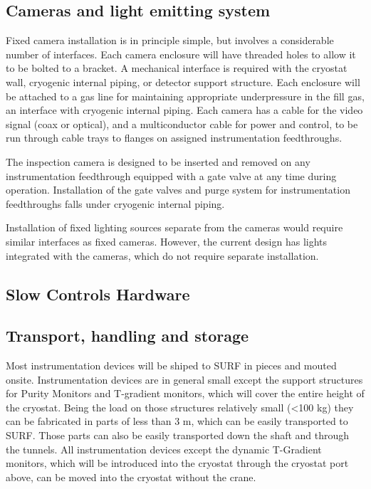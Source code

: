 \subsection{Cameras and light emitting system}
\label{sec:fdgen-slow-cryo-install-c}

Fixed camera installation is in principle simple, but involves a
considerable number of interfaces. Each camera enclosure will have
threaded holes to allow it to be bolted to a bracket. A mechanical
interface is required with the cryostat wall, cryogenic internal
piping, or detector support structure. Each enclosure will be attached
to a gas line for maintaining appropriate underpressure in the fill
gas, an interface with cryogenic internal piping. Each camera has a
cable for the video signal (coax or optical), and a multiconductor
cable for power and control, to be run through cable trays to flanges
on assigned instrumentation feedthroughs.

The inspection camera is designed to be inserted and removed on any
instrumentation feedthrough equipped with a gate valve at any time
during operation.  Installation of the gate valves and purge system
for instrumentation feedthroughs falls under cryogenic internal
piping.

Installation of fixed lighting sources separate from the cameras would
require similar interfaces as fixed cameras.  However, the current
design has lights integrated with the cameras, which do not require separate
installation.



\subsection{Slow Controls Hardware}
\label{sec:fdgen-slow-cryo-install-sc-hard}



\subsection{Transport, handling and storage}
\label{sec:fdgen-slow-cryo-install-transport}

Most instrumentation devices will be shiped to SURF in pieces and mouted onsite. 
Instrumentation devices are in general small except the support structures for Purity Monitors and T-gradient monitors,
which will cover the entire height of the cryostat. Being the load on those structures relatively small (<100 kg) they can be fabricated in parts of less than 3 m,
which can be easily transported to SURF. Those parts can also be easily transported down the shaft and through the tunnels.
All instrumentation devices except the dynamic T-Gradient monitors, which will be introduced into the cryostat through the cryostat port above, can be
moved into the cryostat without the crane.

